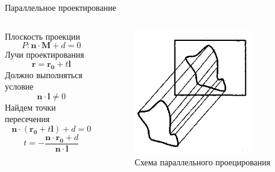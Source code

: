 \documentclass{beamer}
\begin{document}
	\begin{frame}{Параллельное проектирование}
		\begin{columns}
			\begin{column}{0.5\textwidth}
			Плоскость проекции
			\[
				P: \bm{n} \cdot \bm{M} + d = 0	
			\]
			Лучи проектирования
			\[
				\bm{r} = \bm{r_0} + t \bm{l}	
			\]
			Должно выполняться условие
			\[
				\bm{n} \cdot \bm{l} \neq 0	
			\]
			Найдем точки пересечения
			\[
				\bm{n} \cdot (\bm{r_0} + t \bm{l}) + d = 0	
			\]
			\[
				t = -
				\frac{\bm{n} \cdot \bm{r_0} + d}{\bm{n} \cdot \bm{l}}
			\]
			\end{column}
			\begin{column}{0.5\textwidth}
				\begin{figure} 
						\includegraphics[width=0.8\textwidth]{images/parallel_projection.png}
					\caption{Схема параллельного проецирования}
				\end{figure}
			\end{column}
		\end{columns}
			
\end{frame}
\end{document}
